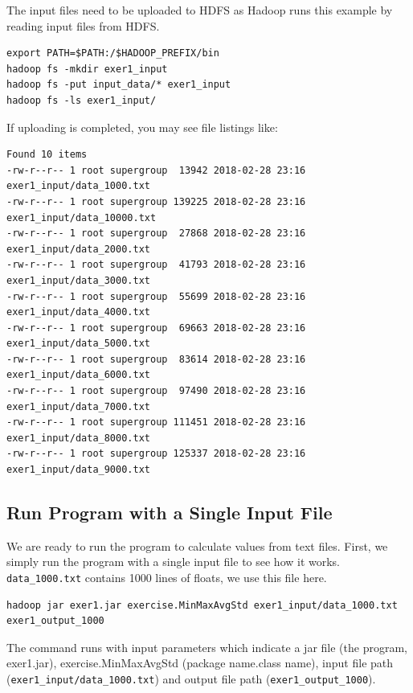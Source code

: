 The input files need to be uploaded to HDFS as Hadoop runs this example by
reading input files from HDFS.

\begin{lstlisting}
export PATH=$PATH:/$HADOOP_PREFIX/bin
hadoop fs -mkdir exer1_input
hadoop fs -put input_data/* exer1_input
hadoop fs -ls exer1_input/
\end{lstlisting}

If uploading is completed, you may see file listings like:

\begin{tiny}
\begin{lstlisting}
Found 10 items
-rw-r--r-- 1 root supergroup  13942 2018-02-28 23:16 exer1_input/data_1000.txt
-rw-r--r-- 1 root supergroup 139225 2018-02-28 23:16 exer1_input/data_10000.txt
-rw-r--r-- 1 root supergroup  27868 2018-02-28 23:16 exer1_input/data_2000.txt
-rw-r--r-- 1 root supergroup  41793 2018-02-28 23:16 exer1_input/data_3000.txt
-rw-r--r-- 1 root supergroup  55699 2018-02-28 23:16 exer1_input/data_4000.txt
-rw-r--r-- 1 root supergroup  69663 2018-02-28 23:16 exer1_input/data_5000.txt
-rw-r--r-- 1 root supergroup  83614 2018-02-28 23:16 exer1_input/data_6000.txt
-rw-r--r-- 1 root supergroup  97490 2018-02-28 23:16 exer1_input/data_7000.txt
-rw-r--r-- 1 root supergroup 111451 2018-02-28 23:16 exer1_input/data_8000.txt
-rw-r--r-- 1 root supergroup 125337 2018-02-28 23:16 exer1_input/data_9000.txt
\end{lstlisting}
\end{tiny}

\subsection{Run Program with a Single Input File}

We are ready to run the program to calculate values from text
files. First, we simply run the program with a single input file to
see how it works. \verb|data_1000.txt| contains 1000 lines of
floats, we use this file here.

\begin{lstlisting}
hadoop jar exer1.jar exercise.MinMaxAvgStd exer1_input/data_1000.txt exer1_output_1000
\end{lstlisting}

The command runs with input parameters which indicate a jar file (the
program, exer1.jar), exercise.MinMaxAvgStd (package name.class name),
input file path (\verb|exer1_input/data_1000.txt|) and output file path
(\verb|exer1_output_1000|).

